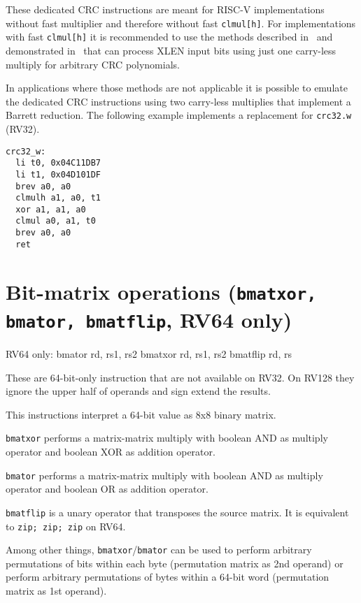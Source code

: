 These dedicated CRC instructions are meant for RISC-V implementations without fast multiplier
and therefore without fast \texttt{clmul[h]}. For implementations with fast \texttt{clmul[h]}
it is recommended to use the methods described in~\cite{FastCRC} and demonstrated in~\cite{Wolf18A}
that can process XLEN input bits using just one carry-less multiply for arbitrary CRC polynomials.

In applications where those methods are not applicable it is possible to emulate the dedicated CRC
instructions using two carry-less multiplies that implement a Barrett reduction. The following example
implements a replacement for \texttt{crc32.w} (RV32).

\begin{minipage}{\linewidth}
\begin{verbatim}
crc32_w:
  li t0, 0x04C11DB7
  li t1, 0x04D101DF
  brev a0, a0
  clmulh a1, a0, t1
  xor a1, a1, a0
  clmul a0, a1, t0
  brev a0, a0
  ret
\end{verbatim}
\end{minipage}


\section{Bit-matrix operations (\texttt{bmatxor, bmator, bmatflip}, RV64 only)}

\begin{rvb}
  RV64 only:
    bmator rd, rs1, rs2
    bmatxor rd, rs1, rs2
    bmatflip rd, rs
\end{rvb}

These are 64-bit-only instruction that are not available on RV32. On RV128 they
ignore the upper half of operands and sign extend the results.

This instructions interpret a 64-bit value as 8x8 binary matrix.

\texttt{bmatxor} performs a matrix-matrix multiply with boolean AND as multiply
operator and boolean XOR as addition operator.

\texttt{bmator} performs a matrix-matrix multiply with boolean AND as multiply
operator and boolean OR as addition operator.

\texttt{bmatflip} is a unary operator that transposes the source matrix. It is
equivalent to \texttt{zip; zip; zip} on RV64.

Among other things, \texttt{bmatxor}/\texttt{bmator} can be used to perform
arbitrary permutations of bits within each byte (permutation matrix as 2nd
operand) or perform arbitrary permutations of bytes within a 64-bit word
(permutation matrix as 1st operand).

